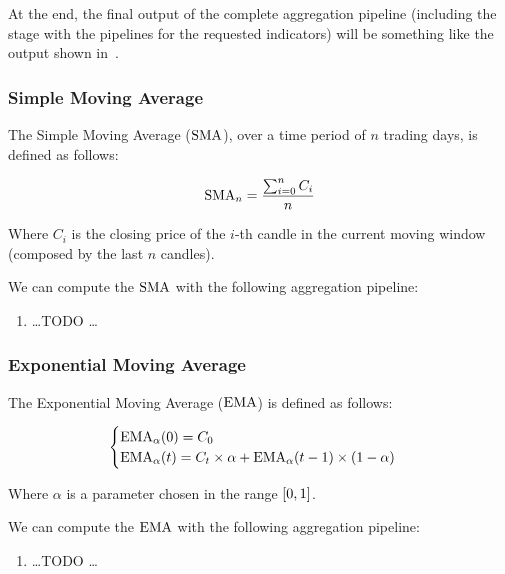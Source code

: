 At the end, the final output of the complete aggregation pipeline (including the
 stage with the pipelines for the requested indicators) will be
something like the output shown in~.



\subsubsection{Simple Moving Average}

The Simple Moving Average (\(\operatorname{SMA}\)), over a time period of \(n\) trading days,
is defined as follows:

\begin{equation}\label{eq:sma}
	\operatorname{SMA}_n = \frac{\sum_{i = 0}^n C_i}{n}
\end{equation}

Where \(C_i\) is the closing price of the \(i\)-th candle in the current moving
window (composed by the last \(n\) candles).

We can compute the \(\operatorname{SMA}\) with the following aggregation pipeline:

\begin{enumerate}
	\item \ldots TODO \ldots
\end{enumerate}

\subsubsection{Exponential Moving Average}

The Exponential Moving Average (\(\operatorname{EMA}\)) is defined as follows:

\begin{equation}\label{eq:ema}
	\begin{cases}
		\operatorname{EMA}_{\alpha}(0) = C_0\\
		\operatorname{EMA}_{\alpha}(t) = C_t\times\alpha +
		\operatorname{EMA}_{\alpha}(t-1)\times(1-\alpha)
	\end{cases}
\end{equation}

Where \(\alpha\) is a parameter chosen in the range \(\interval{0}{1}\).

We can compute the \(\operatorname{EMA}\) with the following aggregation pipeline:

\begin{enumerate}
	\item \ldots TODO \ldots
\end{enumerate}

